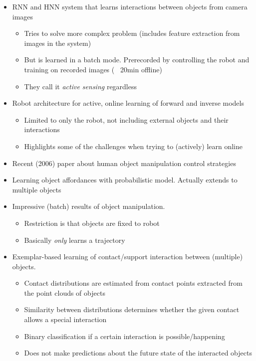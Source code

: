 \begin{itemize}
\begin{itemize}
	\end{itemize}
	\item \cite{nishide2008predicting} RNN and HNN system that learns interactions between objects from camera images
	\begin{itemize}
		\item Tries to solve more complex problem (includes feature extraction from images in the system)
		\item But is learned in a batch mode. Prerecorded by controlling the robot and training on recorded images (~ 20min offline)
		\item They call it \textit{active sensing} regardless
	\end{itemize}
	\item \cite{baranes2013active} Robot architecture for active, online learning of forward and inverse models
	\begin{itemize}
		\item Limited to only the robot, not including external objects and their interactions
		\item Highlights some of the challenges when trying to (actively) learn online
	\end{itemize}
	\item \cite{flanagan2006control} Recent (2006) paper about human object manipulation control strategies
	\item \cite{moldovan2012learning} Learning object affordances with probabilistic model. Actually extends to multiple objects
	\item \cite{levine2015learning} Impressive (batch) results of object manipulation.
	\begin{itemize}
		\item Restriction is that objects are fixed to robot
		\item Basically \textit{only} learns a trajectory
	\end{itemize}
	\item \cite{contactPrediction} Exemplar-based learning of contact/support interaction between (multiple) objects.
	\begin{itemize}
		\item Contact distributions are estimated from contact points extracted from the point clouds of objects
		\item Similarity between distributions determines whether the given contact allows a special interaction
		\item Binary classification if a certain interaction is possible/happening
		\item Does not make predictions about the future state of the interacted objects

\end{itemize}
\end{itemize}
